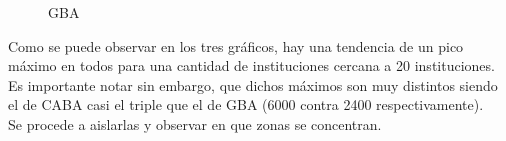 \documentclass[a4paper, 10pt]{article}
\begin{document}
				\begin{figure}
    				\centering
    				\caption{GBA}
				\end{figure}
				\FloatBarrier												
				
				Como se puede observar en los tres gráficos, hay una tendencia de un pico máximo 
				en todos para una cantidad de instituciones cercana a 20 instituciones. 
				Es importante notar sin embargo, que dichos máximos son muy distintos siendo el 
				de CABA casi el triple que el de GBA (6000 contra 2400 respectivamente).\\
				Se procede a aislarlas y observar en que zonas se concentran.\\
				
\end{document}
